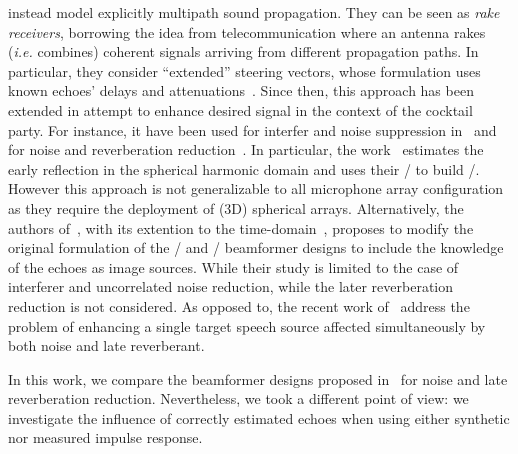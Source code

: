  instead model explicitly multipath sound propagation.
They can be seen as \textit{rake receivers}, borrowing the idea from telecommunication where an antenna rakes (\textit{i.e.} combines) coherent signals arriving from different propagation paths.
In particular, they consider ``extended'' steering vectors, whose formulation uses known echoes' delays and attenuations~.
Since then, this approach has been extended in attempt to enhance desired signal in the context of the cocktail party.
For instance, it have been used for interfer and noise suppression in~ and for noise and reverberation reduction~.
In particular, the work~ estimates the early reflection in the spherical harmonic domain and uses their \DOAs/ to build \ReIR/.
However this approach is not generalizable to all microphone array configuration as they require the deployment of (3D) spherical arrays.
Alternatively, the authors of~, with its extention to the time-domain~, proposes to modify the original formulation of the \DStxt/ and \MVDRtxt/ beamformer designs to include the knowledge of the echoes as image sources.
While their study is limited to the case of interferer and uncorrelated noise reduction, while the later reverberation reduction is not considered.
As opposed to, the recent work of~ address the problem of enhancing a single target speech source affected simultaneously by both noise and late reverberant.

\mynewline
In this work, we compare the beamformer designs proposed in~ for noise and late reverberation reduction.
Nevertheless, we took a different point of view: we investigate the influence of correctly estimated echoes when using either synthetic nor measured impulse response.


